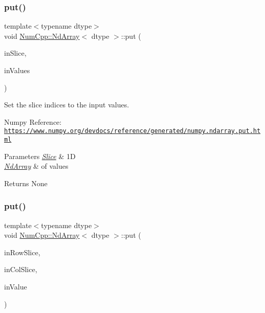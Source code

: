 \subsubsection{\texorpdfstring{put()}{put()}\hspace{0.1cm}{\footnotesize\ttfamily [6/12]}}
{\footnotesize\ttfamily template$<$typename dtype$>$ \\
void \mbox{\hyperlink{class_num_cpp_1_1_nd_array}{Num\+Cpp\+::\+Nd\+Array}}$<$ dtype $>$\+::put (\begin{DoxyParamCaption}\item[{const \mbox{\hyperlink{class_num_cpp_1_1_slice}{Slice}} \&}]{in\+Slice,  }\item[{const \mbox{\hyperlink{class_num_cpp_1_1_nd_array}{Nd\+Array}}$<$ dtype $>$ \&}]{in\+Values }\end{DoxyParamCaption})\hspace{0.3cm}{\ttfamily [inline]}}

Set the slice indices to the input values.

Numpy Reference\+: \href{https://www.numpy.org/devdocs/reference/generated/numpy.ndarray.put.html}{\tt https\+://www.\+numpy.\+org/devdocs/reference/generated/numpy.\+ndarray.\+put.\+html}


\begin{DoxyParams}{Parameters}
{\em \mbox{\hyperlink{class_num_cpp_1_1_slice}{Slice}}} & 1D \\
\hline
{\em \mbox{\hyperlink{class_num_cpp_1_1_nd_array}{Nd\+Array}}} & of values \\
\hline
\end{DoxyParams}
\begin{DoxyReturn}{Returns}
None 
\end{DoxyReturn}
\mbox{\label{class_num_cpp_1_1_nd_array_a70d4c18e43f58365431977562046b631}} 
\subsubsection{\texorpdfstring{put()}{put()}\hspace{0.1cm}{\footnotesize\ttfamily [7/12]}}
{\footnotesize\ttfamily template$<$typename dtype$>$ \\
void \mbox{\hyperlink{class_num_cpp_1_1_nd_array}{Num\+Cpp\+::\+Nd\+Array}}$<$ dtype $>$\+::put (\begin{DoxyParamCaption}\item[{const \mbox{\hyperlink{class_num_cpp_1_1_slice}{Slice}} \&}]{in\+Row\+Slice,  }\item[{const \mbox{\hyperlink{class_num_cpp_1_1_slice}{Slice}} \&}]{in\+Col\+Slice,  }\item[{dtype}]{in\+Value }\end{DoxyParamCaption})\hspace{0.3cm}{\ttfamily [inline]}}

